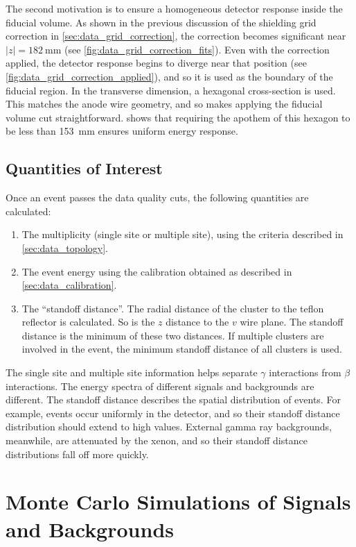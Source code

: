 \documentclass[herrin-thesis.tex]{subfiles}
\begin{document}
The second motivation is to ensure a homogeneous detector response inside the fiducial volume. As shown in the previous discussion of the shielding grid correction in \cref{sec:data_grid_correction}, the correction becomes significant near \(|z|=\SI{182}{\mm}\) (see \cref{fig:data_grid_correction_fits}). Even with the correction applied, the detector response begins to diverge near that position (see \cref{fig:data_grid_correction_applied}), and so it is used as the boundary of the fiducial region. In the transverse dimension, a hexagonal cross-section is used. This matches the anode wire geometry, and so makes applying the fiducial volume cut straightforward.  shows that requiring the apothem of this hexagon to be less than \SI{153}{\mm} ensures uniform energy response.

\subsection{Quantities of Interest}
\label{sec:analysis_quantities_of_interest}
Once an event passes the data quality cuts, the following quantities are calculated:
\begin{enumerate}
\item The multiplicity (single site or multiple site), using the criteria described in \cref{sec:data_topology}.
\item The event energy using the calibration obtained as described in \cref{sec:data_calibration}.
\item The ``standoff distance''. The radial distance of the cluster to the teflon reflector is calculated. So is the \(z\) distance to the \(v\) wire plane. The standoff distance is the minimum of these two distances. If multiple clusters are involved in the event, the minimum standoff distance of all clusters is used.
\end{enumerate}

The single site and multiple site information helps separate \(\gamma\) interactions from \(\beta\) interactions. The energy spectra of different signals and backgrounds are different. The standoff distance describes the spatial distribution of events. For example, \twonu{} events occur uniformly in the detector, and so their standoff distance distribution should extend to high values. External gamma ray backgrounds, meanwhile, are attenuated by the xenon, and so their standoff distance distributions fall off more quickly.

\section{Monte Carlo Simulations of Signals and Backgrounds}
\label{sec:analysis_monte_carlo}
\end{document}
